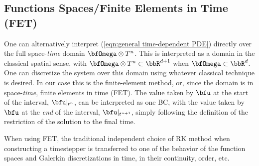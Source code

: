 \subsection{Functions Spaces/Finite Elements in Time (FET)}\label{cha:FET}
    One can alternatively interpret (\ref{eqn:general time-dependent PDE}) directly over the full space-\emph{time} domain $\bfOmega\otimes T^{n}$. This is interpreted as a domain in the classical spatial sense, with $\bfOmega\otimes T^{n}  \subset  \bbR^{d + 1}$ when $\bfOmega  \subset  \bbR^{d}$. One can discretize the system over this domain using whatever classical technique is desired. In our case this is the finite-element method, or, since the domain is in space-\emph{time}, finite elements in time (FET). The value taken by $\bfu$ at the start of the interval, $\bfu|_{t^{n}}$, can be interpreted as one BC, with the value taken by $\bfu$ at the \emph{end} of the interval, $\bfu|_{t^{n + 1}}$, simply following the definition of the restriction of the solution to the final time.
    
    When using FET, the traditional independent choice of RK method when constructing a timestepper is transferred to one of the behavior of the function spaces and Galerkin discretizations in time, in their continuity, order, etc.
    
